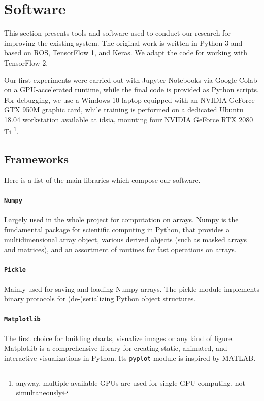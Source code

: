 \section{Software}
\label{sec:software}

This section presents tools and software used to conduct our research for improving the existing system. The original work is written in Python 3 and based on ROS, TensorFlow 1, and Keras. We adapt the code for working with TensorFlow 2.

Our first experiments were carried out with Jupyter Notebooks via Google Colab on a GPU-accelerated runtime, while the final code is provided as Python scripts. For debugging, we use a Windows 10 laptop equipped with an NVIDIA GeForce GTX 950M graphic card, while training is performed on a dedicated Ubuntu 18.04 workstation available at \gls{idsia}, mounting four NVIDIA GeForce RTX 2080 Ti \footnote{anyway, multiple available GPUs are used for single-GPU computing, not simultaneously}.



\subsection{Frameworks}
\label{subsec:frameworks}

Here is a list of the main libraries which compose our software.

\paragraph*{\texttt{Numpy}}
Largely used in the whole project for computation on arrays. Numpy is the fundamental package for scientific computing in Python, that provides a multidimensional array object, various derived objects (such as masked arrays and matrices), and an assortment of routines for fast operations on arrays. 

\paragraph*{\texttt{Pickle}}
Mainly used for saving and loading Numpy arrays. The pickle module implements binary protocols for (de-)serializing Python object structures. 

\paragraph*{\texttt{Matplotlib}}
The first choice for building charts, visualize images or any kind of figure. Matplotlib is a comprehensive library for creating static, animated, and interactive visualizations in Python. Its \texttt{pyplot} module is inspired by MATLAB.


